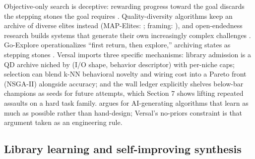\documentclass[11pt]{article}
\begin{document}
Objective-only search is deceptive: rewarding progress toward the goal discards the stepping stones the goal requires \citep{lehman2011, woolley2011}. Quality-diversity algorithms keep an archive of diverse elites instead (MAP-Elites: \citealp{mouret2015}; framing: \citealp{pugh2016}), and open-endedness research builds systems that generate their own increasingly complex challenges \citep{stanley2017, brant2017, wang2019poet, wang2020poet, faldor2024}. Go-Explore operationalizes ``first return, then explore,'' archiving states as stepping stones \citep{ecoffet2021}. Versal imports three specific mechanisms: library admission is a QD archive niched by (I/O shape, behavior descriptor) with per-niche caps; selection can blend k-NN behavioral novelty and wiring cost into a Pareto front (NSGA-II) alongside accuracy; and the wall ledger explicitly shelves below-bar champions as seeds for future attempts, which Section 7 shows lifting repeated assaults on a hard task family. \citet{clune2019} argues for AI-generating algorithms that learn as much as possible rather than hand-design; Versal's no-priors constraint is that argument taken as an engineering rule.

\subsection{Library learning and self-improving synthesis}
\end{document}
